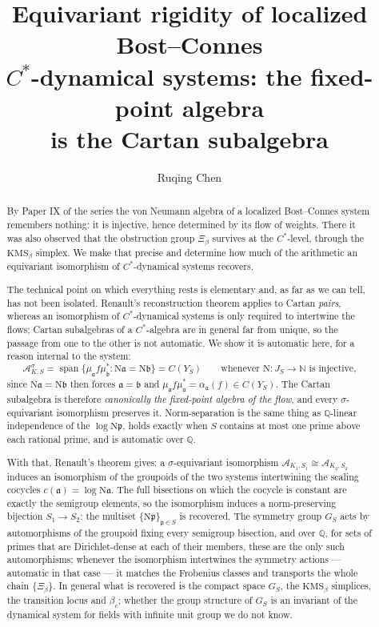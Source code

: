 \documentclass[11pt]{amsart}
\title[The fixed-point algebra is the Cartan subalgebra]{Equivariant rigidity of localized Bost--Connes\\ $C^*$-dynamical systems: the fixed-point algebra\\ is the Cartan subalgebra}
\author{Ruqing Chen}
\date{}
\numberwithin{equation}{section}
\theoremstyle{definition}
\theoremstyle{remark}
\newcommand{\Q}{\mathbb{Q}}
\newcommand{\N}{\mathbb{N}}
\newcommand{\cA}{\mathcal{A}}
\newcommand{\pp}{\mathfrak{p}}
\newcommand{\aaa}{\mathfrak{a}}
\newcommand{\bb}{\mathfrak{b}}
\newcommand{\Ns}{\mathrm{N}}
\newcommand{\spn}{\operatorname{span}}
\begin{document}
\begin{abstract}
By Paper IX of the series the von Neumann algebra of a localized Bost--Connes system
remembers nothing: it is injective, hence determined by its flow of weights. There it was
also observed that the obstruction group $\Xi_\beta$ survives at the $C^*$-level, through
the $\mathrm{KMS}_\beta$ simplex. We make that precise and determine how much of the
arithmetic an equivariant isomorphism of $C^*$-dynamical systems recovers.

The technical point on which everything rests is elementary and, as far as we can tell, has
not been isolated. Renault's reconstruction theorem applies to Cartan \emph{pairs}, whereas
an isomorphism of $C^*$-dynamical systems is only required to intertwine the flows; Cartan
subalgebras of a $C^*$-algebra are in general far from unique, so the passage from one to the
other is not automatic. We show it is automatic here, for a reason internal to the system:
\[
\cA_{K,S}^{\sigma}=\overline{\spn}\bigl\{\mu_\aaa f\mu_\bb^*:\Ns\aaa=\Ns\bb\bigr\}
=C(Y_S)\qquad\text{whenever }\Ns:J_S\to\N\text{ is injective,}
\]
since $\Ns\aaa=\Ns\bb$ then forces $\aaa=\bb$ and $\mu_\aaa f\mu_\aaa^*=\alpha_\aaa(f)\in C(Y_S)$.
The Cartan subalgebra is therefore \emph{canonically the fixed-point algebra of the flow},
and every $\sigma$-equivariant isomorphism preserves it. Norm-separation is the same thing
as $\Q$-linear independence of the $\log\Ns\pp$, holds exactly when $S$ contains at most one
prime above each rational prime, and is automatic over $\Q$.

With that, Renault's theorem gives: a $\sigma$-equivariant isomorphism
$\cA_{K_1,S_1}\cong\cA_{K_2,S_2}$ induces an isomorphism of the groupoids of the two systems
intertwining the scaling cocycles $c(\aaa)=\log\Ns\aaa$. The full bisections on which the
cocycle is constant are exactly the semigroup elements, so the isomorphism induces a
norm-preserving bijection $S_1\to S_2$: the multiset $\{\Ns\pp\}_{\pp\in S}$ is recovered. The
symmetry group $G_S$ acts by automorphisms of the groupoid fixing every semigroup
bisection, and over $\Q$, for sets of primes that are Dirichlet-dense at each of their
members, these are the only such automorphisms; whenever the isomorphism intertwines the
symmetry actions --- automatic in that case --- it matches the Frobenius classes and
transports the whole chain $\{\Xi_\beta\}$. In general what is recovered is the compact
space $G_S$, the $\mathrm{KMS}_\beta$ simplices, the transition locus and $\beta_c$; whether the
group structure of $G_S$ is an invariant of the dynamical system for fields with infinite
unit group we do not know.


\end{abstract}
\end{document}

